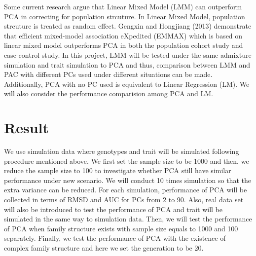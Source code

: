 \documentclass[12pt]{article}
\begin{document}
Some current research argue that Linear Mixed Model (LMM) can outperform PCA in correcting for population strcuture.
In Linear Mixed Model, population strcuture is treated as random effect.
Gengxin and Hongjiang (2013) demonstrate that efficient mixed-model association eXpedited (EMMAX) which is based on linear mixed model outperforms PCA in both the population cohort study and case-control study.
In this project, LMM will be tested under the same admixture simulation and trait simulation to PCA and thus, comparison between LMM and PAC with different PCs used under different situations can be made.
Additionally, PCA with no PC used is equivalent to Linear Regression (LM).
We will also consider the performance comparision among PCA and LM. 



\section{Result}

We use simulation data where genotypes and trait will be simulated following procedure mentioned above.
We first set the sample size to be 1000 and then, we reduce the sample size to 100 to investigate whether PCA still have similar performance under new scenario.
We will conduct 10 times simulation so that the extra variance can be reduced.
For each simulation, performance of PCA will be collected in terms of RMSD and AUC for PCs from 2 to 90.
Also, real data set will also be introduced to test the performance of PCA and trait will be simulated in the same way to simulation data.
Then, we will test the performance of PCA when family structure exists with sample size equals to 1000 and 100 separately.
Finally, we test the performance of PCA with the existence of complex family structure and here we set the generation to be 20.
\end{document}
